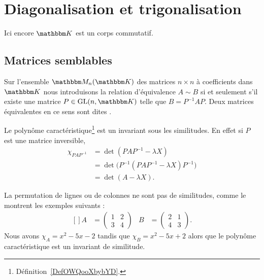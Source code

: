 \section{Diagonalisation et trigonalisation}

Ici encore \( \eK\) est un corps commutatif.

\subsection{Matrices semblables}

\begin{definition} \label{DefCQNFooSDhDpB}
    Sur l'ensemble \( \eM_n(\eK)\) des matrices \( n\times n\) à coefficients dans \(\eK\) nous introduisons la relation d'équivalence \( A\sim B\) si et seulement s'il existe une matrice \( P\in\GL(n,\eK)\) telle que \( B=P^{-1}AP\). Deux matrices équivalentes en ce sens sont dites .
\end{definition}

Le polynôme caractéristique\footnote{Définition~\ref{DefOWQooXbybYD}.} est un invariant sous les similitudes. En effet si \( P\) est une matrice inversible,
\begin{subequations}
    \begin{align}
        \chi_{PAP^{-1}}&=\det(PAP^{-1}-\lambda X)\\
        &=\det\big( P^{-1}(PAP^{-1}-\lambda X)P^{-1} \big)\\
        &=\det(A-\lambda X).
    \end{align}
\end{subequations}

La permutation de lignes ou de colonnes ne sont pas de similitudes, comme le montrent les exemples suivants :
\begin{equation}
    \begin{aligned}[]
        A&=\begin{pmatrix}
            1    &   2    \\
            3    &   4
        \end{pmatrix}&
        B&=\begin{pmatrix}
            2    &   1    \\
            4    &   3
        \end{pmatrix}.
    \end{aligned}
\end{equation}
Nous avons \( \chi_A=x^2-5x-2\) tandis que \( \chi_B=x^2-5x+2\) alors que le polynôme caractéristique est un invariant de similitude.

